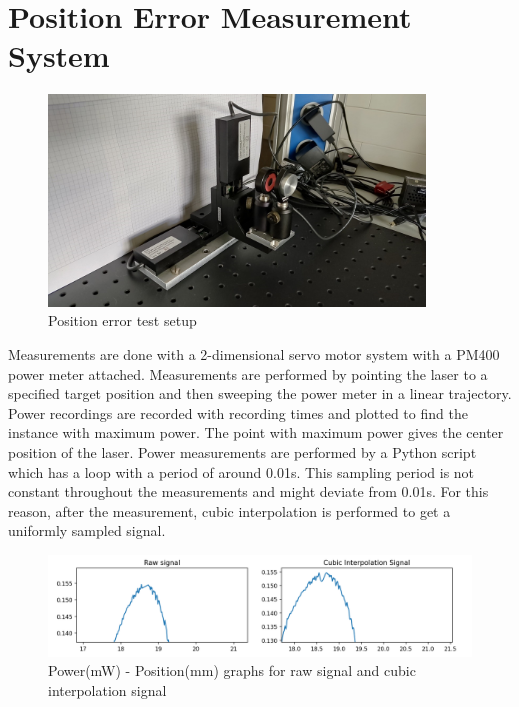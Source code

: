 \section{Position Error Measurement System}
\label{sec:Position Error Measurement System}





\begin{figure}[!htb]\centering
    \includegraphics*[width = 10cm]{bilder/project/error_test_setup.jpg}
    \caption{Position error test setup}
    \label{fig:error_test}
\end{figure}

Measurements are done with a 2-dimensional servo motor system with
a PM400 power meter attached.
Measurements are performed by pointing the laser to a specified
target position and then sweeping the power meter in a linear
trajectory. Power recordings are recorded with recording times
and plotted to find the instance with maximum power. The point
with maximum power gives the center position of the laser.
Power measurements are performed by a Python script which
has a loop with a period of around 0.01s. This sampling
period is not constant throughout the measurements and
might deviate from 0.01s.  For this reason, after the
measurement, cubic interpolation is performed to get
a uniformly sampled signal.


\begin{figure}[!htb]\centering
    \includegraphics*[width = 16cm]{bilder/project/error_test_graph_1.png}
    \caption{Power(mW) - Position(mm) graphs for raw signal and cubic interpolation signal}
    \label{fig:error_test_graph_1}
\end{figure}


